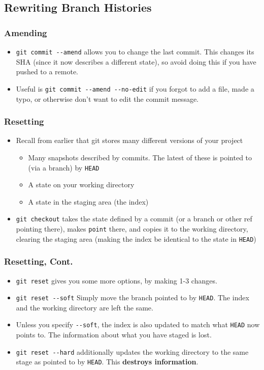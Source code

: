 \documentclass{beamer}
\begin{document}
\subsection{Rewriting Branch Histories}

\begin{frame}[fragile]
\frametitle{Amending}
\begin{itemize}
\item \lstinline{git commit --amend} allows you to change the last commit. This changes its SHA (since it now describes a different state), so avoid doing this if you have pushed to a remote.
\item Useful is \lstinline{git commit --amend --no-edit} if you forgot to add a file, made a typo, or otherwise don't want to edit the commit message.
\end{itemize}
\end{frame}

\begin{frame}[fragile]
\frametitle{Resetting}
\begin{itemize}
\item Recall from earlier that git stores many different versions of your project
\begin{itemize}
\item Many snapshots described by commits. The latest of these is pointed to (via a branch) by \texttt{HEAD}
\item A state on your working directory
\item A state in the staging area (the index)
\end{itemize}
\item \lstinline{git checkout} takes the state defined by a commit (or a branch or other ref pointing there), makes \lstinline{point} there, and copies it to the working directory, clearing the staging area (making the index be identical to the state in \lstinline{HEAD})
\end{itemize}
\end{frame}

\begin{frame}[fragile]
\frametitle{Resetting, Cont.}
\begin{itemize}
\item \lstinline{git reset} gives you some more options, by making 1-3 changes.
\item \lstinline{git reset --soft} Simply move the branch pointed to by \lstinline{HEAD}. The index and the working directory are left the same.
\item Unless you specify \lstinline{--soft}, the index is also updated to match what \lstinline{HEAD} now points to. The information about what you have staged is lost.
\item \lstinline{git reset --hard} additionally updates the working directory to the same stage as pointed to by \lstinline{HEAD}. This \textbf{destroys information}.
\end{itemize}
\end{frame}
\end{document}

